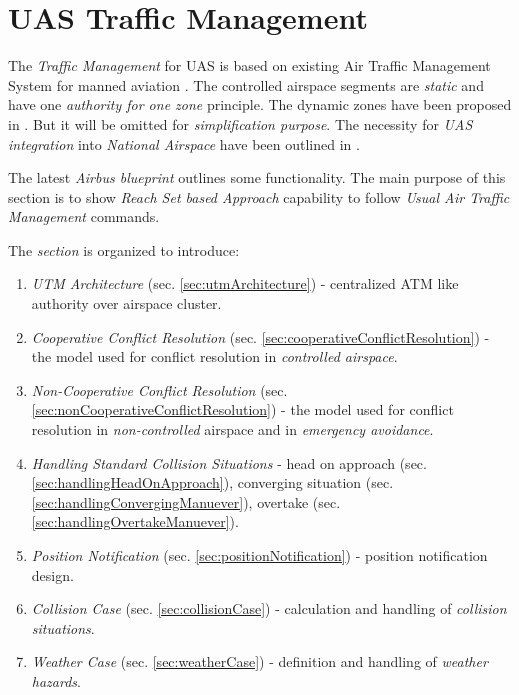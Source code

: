 \cleardoublepage
\section{UAS Traffic Management}\label{sec:UASTrafficManagement}

\noindent The \emph{Traffic Management} for UAS is based on existing Air Traffic Management System for manned aviation \cite{icao4444}. The controlled airspace segments are \emph{static} and have one \emph{authority for one zone} principle. The dynamic zones have been proposed in \cite{gerdes2016dynamic}. But it will be omitted for \emph{simplification purpose}. The necessity for \emph{UAS integration} into \emph{National Airspace} have been outlined in \cite{spriesterbach2013unmanned}.

The latest \emph{Airbus blueprint} \cite{airbusUTM2018blueprint} outlines some functionality. The main purpose of this section is to show \emph{Reach Set based Approach} capability to follow \emph{Usual Air Traffic Management} commands.

The \emph{section} is organized to introduce:
\begin{enumerate}
    \item \emph{UTM Architecture} (sec. \ref{sec:utmArchitecture}) - centralized ATM like authority over airspace cluster.
    
    \item \emph{Cooperative Conflict Resolution} (sec. \ref{sec:cooperativeConflictResolution}) - the model used for conflict resolution in \emph{controlled airspace}.
    
    \item \emph{Non-Cooperative Conflict Resolution} (sec. \ref{sec:nonCooperativeConflictResolution})  - the model used for conflict resolution in \emph{non-controlled} airspace and in \emph{emergency avoidance}.
    
    \item \emph{Handling Standard Collision Situations} - head on approach (sec. \ref{sec:handlingHeadOnApproach}), converging situation (sec. \ref{sec:handlingConvergingManuever}), overtake (sec. \ref{sec:handlingOvertakeManuever}).
    
    \item \emph{Position Notification} (sec. \ref{sec:positionNotification}) - position notification design.
    
    \item \emph{Collision Case} (sec. \ref{sec:collisionCase}) - calculation and handling of \emph{collision situations}.
    
    \item \emph{Weather Case} (sec. \ref{sec:weatherCase}) - definition and handling of \emph{weather hazards}.
\end{enumerate}